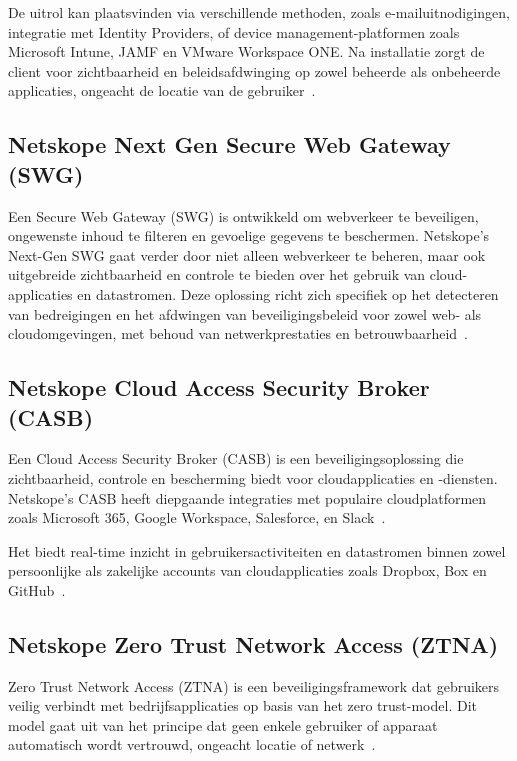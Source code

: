 De uitrol kan plaatsvinden via verschillende methoden, zoals e-mailuitnodigingen, integratie met Identity Providers, of device management-platformen zoals Microsoft Intune, JAMF en VMware Workspace ONE. Na installatie zorgt de client voor zichtbaarheid en beleidsafdwinging op zowel beheerde als onbeheerde applicaties, ongeacht de locatie van de gebruiker~\autocite{Netskope2025-8}.

\subsection{Netskope Next Gen Secure Web Gateway (SWG)}
Een Secure Web Gateway (SWG) is ontwikkeld om webverkeer te beveiligen, ongewenste inhoud te filteren en gevoelige gegevens te beschermen. Netskope's Next-Gen SWG gaat verder door niet alleen webverkeer te beheren, maar ook uitgebreide zichtbaarheid en controle te bieden over het gebruik van cloud-applicaties en datastromen.
Deze oplossing richt zich specifiek op het detecteren van bedreigingen en het afdwingen van beveiligingsbeleid voor zowel web- als cloudomgevingen, met behoud van netwerkprestaties en betrouwbaarheid~\autocite{Netskope2025-3}.

\subsection{Netskope Cloud Access Security Broker (CASB)}
Een Cloud Access Security Broker (CASB) is een beveiligingsoplossing die zichtbaarheid, controle en bescherming biedt voor cloudapplicaties en -diensten. Netskope's CASB heeft diepgaande integraties met populaire cloudplatformen zoals Microsoft 365, Google Workspace, Salesforce, en Slack~\autocite{Netskope2025-4}.

\vspace{2ex}

Het biedt real-time inzicht in gebruikersactiviteiten en datastromen binnen zowel persoonlijke als zakelijke accounts van cloudapplicaties zoals Dropbox, Box en GitHub~\autocite{Netskope2025-4}.

\subsection{Netskope Zero Trust Network Access (ZTNA)}
Zero Trust Network Access (ZTNA) is een beveiligingsframework dat gebruikers veilig verbindt met bedrijfsapplicaties op basis van het zero trust-model. Dit model gaat uit van het principe dat geen enkele gebruiker of apparaat automatisch wordt vertrouwd, ongeacht locatie of netwerk~\autocite{Netskope2025-5}. 

